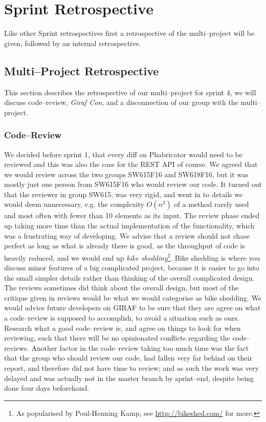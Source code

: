 \section{Sprint Retrospective}\label{sec:S4retro}

Like other Sprint retrospectives first a retrospective of the multi--project will be given, followed by an internal retrospective.

\subsection{Multi--Project Retrospective}
This section describes the retrospective of our multi--project for sprint 4, we will discuss code--review, \textit{Giraf Con}, and a disconnection of our group with the multi--project.

\subsubsection*{Code--Review}
We decided before sprint 1, that every diff on Phabricator would need to be reviewed and this was also the case for the REST API of course.
We agreed that we would review across the two groups SW615F16 and SW618F16, but it was mostly just one person from SW615F16 who would review our code.
It turned out that the reviewer in group SW615, was very rigid, and went in to details we would deem unnecessary, e.g. the complexity $O(n^2)$ of a method rarely used and most often with fewer than 10 elements as its input.
The review phase ended up taking more time than the actual implementation of the functionality, which was a frustrating way of developing.
We advise that a review should not chase perfect as long as what is already there is good, as the throughput of code is heavily reduced, and we would end up \textit{bike shedding}\footnote{As popularised by Poul-Henning Kamp, see \url{http://bikeshed.com/} for more.}.
Bike shedding is where you discuss minor features of a big complicated project, because it is easier to go into the small simpler details rather than thinking of the overall complicated design.
The reviews sometimes did think about the overall design, but most of the critique given in reviews would be what we would categorise as bike shedding.
We would advice future developers on GIRAF to be sure that they are agree on what a code--review is supposed to accomplish, to avoid a situation such as ours.
Research what a good code--review is, and agree on things to look for when reviewing, such that there will be no opinionated conflicts regarding the code--reviews.
Another factor in the code--review taking too much time was the fact that the group who should review our code, had fallen very far behind on their report, and therefore did not have time to review; and as such the work was very delayed and was actually not in the master branch by sprint--end, despite being done four days beforehand.

